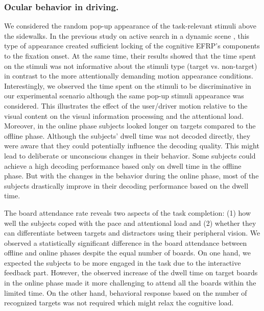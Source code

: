 \documentclass[12pt]{iopart}
\begin{document}
\subsubsection*{Ocular behavior in driving.}
We considered the random pop-up appearance of the task-relevant
stimuli above the sidewalks.  In the previous study
on active search in a dynamic scene \cite{uscumlic_active_2016},
this type of appearance created sufficient locking
of the cognitive EFRP's components to the fixation onset.
At the same time, their results showed that the time spent
on the stimuli was not informative about
the stimuli type (target vs. non-target) in contrast
to the more attentionally demanding motion appearance conditions.   
Interestingly, we observed  the time spent on the stimuli  to be
discriminative in our experimental scenario although the same
pop-up stimuli appearance was considered.
This illustrates the effect of the user/driver motion
relative to the visual content on the visual information
processing and the attentional load. Moreover, in the online phase
subjects looked longer on targets compared to the offline phase.
Although the subjects' dwell time was not decoded directly, they were aware
that they could potentially influence the decoding quality. This might
lead to deliberate or unconscious changes in their behavior.
Some subjects could achieve a high decoding performance based
only on dwell time in the offline phase. But with the changes in the behavior
during the online phase, most of the subjects drastically improve in their decoding performance
based on the dwell time.


The board attendance rate reveals two aspects of the task completion:
(1) how well the subjects coped with the pace and attentional load
and (2) whether they can differentiate between targets and distractors
using their peripheral vision.
We observed a statistically significant difference in the board attendance
between offline and online phases despite the equal number of boards.
On one hand, we expected the subjects to 
be more engaged in the task due to the interactive feedback part.
However, the observed increase of the dwell time on target boards 
in the online phase made it more challenging to attend all
the boards within the limited time.
On the other hand, behavioral response based on the number of recognized targets
was not required which might relax the cognitive load.
\end{document}
